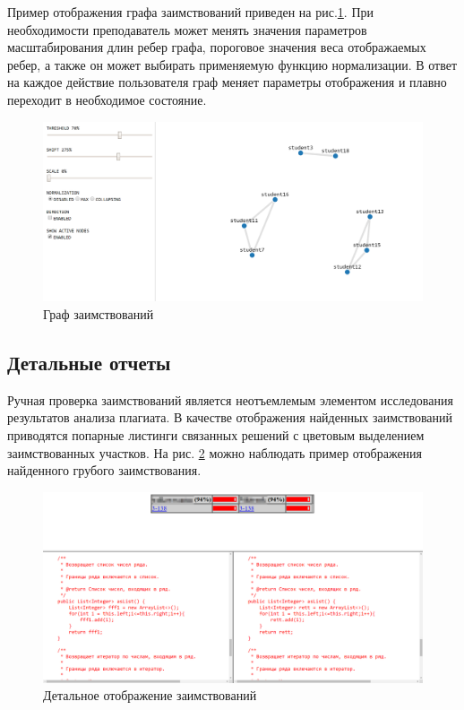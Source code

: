 \documentclass[a4paper,14pt]{extarticle}
\begin{document}
Пример отображения графа заимствований приведен на рис.\ref{fig:graph}. При необходимости преподаватель может менять значения параметров масштабирования длин ребер графа, пороговое значения веса отображаемых ребер, а также он может выбирать применяемую функцию нормализации. В ответ на каждое действие пользователя граф меняет параметры отображения и плавно переходит в необходимое состояние.

\begin{figure}[h!]
\centering
\includegraphics[width=1.0\textwidth]{graph.png}
\caption{Граф заимствований}
\label{fig:graph}
\end{figure}

\subsection{Детальные отчеты}

Ручная проверка заимствований является неотъемлемым элементом исследования результатов анализа плагиата. В качестве отображения найденных заимствований приводятся попарные листинги связанных решений с цветовым выделением заимствованных участков. На рис. \ref{fig:diff} можно наблюдать пример отображения найденного грубого заимствования.

\begin{figure}[h!]
\centering
\includegraphics[width=1.0\textwidth]{moss_diff.png}
\caption{Детальное отображение заимствований}
\label{fig:diff}
\end{figure}
\end{document}
